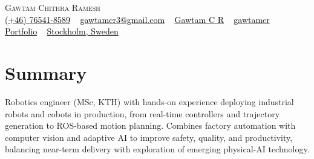 \documentclass[letterpaper, 11pt]{article}
\newcommand{\vHeadingName}{3pt}    %
\newcommand{\vHeadingEnd}{-3pt}    %
\newcommand{\vSummaryTop}{0pt}     %
\newcommand{\vSummaryEnd}{-6pt}    %
\begin{document}
\begin{center}
    {\Huge \scshape Gawtam Chithra Ramesh} \\
    \vspace{\vHeadingName}
    \small
    { \href{tel:+46764518589}{{\faMobile*} \textcolor{black}{(+46) 76541-8589}} ~
    \href{mailto:gawtamcr3@gmail.com}{{\faPaperPlane} \textcolor{black}{gawtamcr3@gmail.com}} ~
    \href{https://linkedin.com/in/gawtamcr/}{{\faLinkedinIn} \textcolor{black}{Gawtam C R}} ~
    \href{https://github.com/gawtamcr}{{\faGithub} \textcolor{black}{gawtamcr}} ~
    \href{https://gawtamcr.github.io/}{{\faGlobe} \textcolor{black}{Portfolio}} ~
    \href{https://maps.google.com/?q=Stockholm,Sweden}{{\faMapMarker*} \textcolor{black}{Stockholm, Sweden}}
    }
    \vspace{\vHeadingEnd}
\end{center}

\section{\color{Blue}Summary}
\vspace{\vSummaryTop}
\small{Robotics engineer (MSc, KTH) with hands-on experience deploying industrial robots and cobots in production, from real-time controllers and trajectory generation to ROS-based motion planning. Combines factory automation with computer vision and adaptive AI to improve safety, quality, and productivity, balancing near-term delivery with exploration of emerging physical-AI technology.}
\vspace{\vSummaryEnd}

\end{document}
